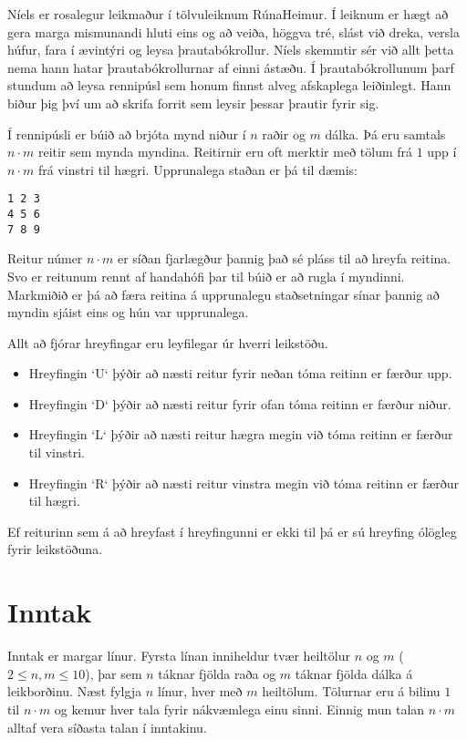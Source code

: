%
Níels er rosalegur leikmaður í tölvuleiknum RúnaHeimur.
Í leiknum er hægt að gera marga mismunandi hluti eins og að veiða, höggva tré, slást við dreka, versla húfur, fara í ævintýri og leysa þrautabókrollur.
Níels skemmtir sér við allt þetta nema hann hatar þrautabókrollurnar af einni ástæðu.
Í þrautabókrollunum þarf stundum að leysa rennipúsl sem honum finnst alveg afskaplega leiðinlegt.
Hann biður þig því um að skrifa forrit sem leysir þessar þrautir fyrir sig.

Í rennipúsli er búið að brjóta mynd niður í $n$ raðir og $m$ dálka.
Þá eru samtals $n \cdot m$ reitir sem mynda myndina.
Reitirnir eru oft merktir með tölum frá $1$ upp í $n \cdot m$ frá vinstri til hægri.
Upprunalega staðan er þá til dæmis:
\begin{verbatim}1 2 3
4 5 6
7 8 9\end{verbatim}
Reitur númer $n \cdot m$ er síðan fjarlægður þannig það sé pláss til að hreyfa reitina.
Svo er reitunum rennt af handahófi þar til búið er að rugla í myndinni.
Markmiðið er þá að færa reitina á upprunalegu staðsetningar sínar þannig að myndin sjáist eins og hún var upprunalega.

Allt að fjórar hreyfingar eru leyfilegar úr hverri leikstöðu.
\begin{itemize}
    \item Hreyfingin `U` þýðir að næsti reitur fyrir neðan tóma reitinn er færður upp.
    \item Hreyfingin `D` þýðir að næsti reitur fyrir ofan tóma reitinn er færður niður.
    \item Hreyfingin `L` þýðir að næsti reitur hægra megin við tóma reitinn er færður til vinstri.
    \item Hreyfingin `R` þýðir að næsti reitur vinstra megin við tóma reitinn er færður til hægri.
\end{itemize}
Ef reiturinn sem á að hreyfast í hreyfingunni er ekki til þá er sú hreyfing ólögleg fyrir leikstöðuna.

\section*{Inntak}
Inntak er margar línur.
Fyrsta línan inniheldur tvær heiltölur $n$ og $m$ ($2 \leq n, m \leq 10$), þar sem $n$ táknar fjölda raða og $m$ táknar fjölda dálka á leikborðinu.
Næst fylgja $n$ línur, hver með $m$ heiltölum. Tölurnar eru á bilinu $1$ til $n \cdot m$ og kemur hver tala fyrir nákvæmlega einu sinni.
Einnig mun talan $n \cdot m$ alltaf vera síðasta talan í inntakinu.

